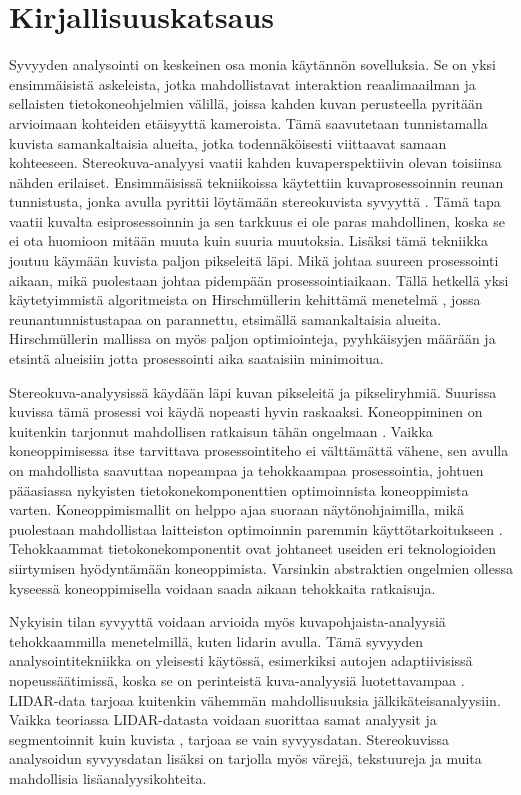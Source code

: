 \chapter{Kirjallisuuskatsaus}%
\label{ch:kirjallisuuskatsaus}

Syvyyden analysointi on keskeinen osa monia käytännön sovelluksia.
Se on yksi ensimmäisistä askeleista, jotka mahdollistavat interaktion reaalimaailman ja sellaisten tietokoneohjelmien välillä,
joissa kahden kuvan perusteella pyritään arvioimaan kohteiden etäisyyttä kameroista. 
Tämä saavutetaan tunnistamalla kuvista samankaltaisia alueita, jotka todennäköisesti viittaavat samaan kohteeseen.
Stereokuva-analyysi vaatii kahden kuvaperspektiivin olevan toisiinsa nähden erilaiset.
Ensimmäisissä tekniikoissa käytettiin kuvaprosessoinnin reunan tunnistusta, jonka avulla pyrittii löytämään stereokuvista syvyyttä \cite{BakerHenryHarlyn1982DfEa}.
Tämä tapa vaatii kuvalta esiprosessoinnin ja sen tarkkuus ei ole paras mahdollinen, koska se ei ota huomioon mitään muuta kuin suuria muutoksia.
Lisäksi tämä tekniikka joutuu käymään kuvista paljon pikseleitä läpi. 
Mikä johtaa suureen prosessointi aikaan, mikä puolestaan johtaa pidempään prosessointiaikaan.
Tällä hetkellä yksi käytetyimmistä algoritmeista on Hirschmüllerin kehittämä menetelmä \cite{hirschmuller2005babel},
jossa reunantunnistustapaa on parannettu, etsimällä samankaltaisia alueita. 
Hirschmüllerin mallissa on myös paljon optimiointeja, pyyhkäisyjen määrään ja etsintä alueisiin jotta prosessointi aika saataisiin minimoitua.

Stereokuva-analyysissä käydään läpi kuvan pikseleitä ja pikseliryhmiä.
Suurissa kuvissa tämä prosessi voi käydä nopeasti hyvin raskaaksi.
Koneoppiminen on kuitenkin tarjonnut mahdollisen ratkaisun tähän ongelmaan \cite{LagaHamid2022ASoD}.
Vaikka koneoppimisessa itse tarvittava prosessointiteho ei välttämättä vähene, 
sen avulla on mahdollista saavuttaa nopeampaa ja tehokkaampaa prosessointia,
johtuen pääasiassa nykyisten tietokonekomponenttien optimoinnista koneoppimista varten.
Koneoppimismallit on helppo ajaa suoraan näytönohjaimilla, mikä puolestaan mahdollistaa laitteiston optimoinnin paremmin käyttötarkoitukseen \cite{LeeVictorW2010Dt1G}.
Tehokkaammat tietokonekomponentit ovat johtaneet useiden eri teknologioiden siirtymisen hyödyntämään koneoppimista.
Varsinkin abstraktien ongelmien ollessa kyseessä koneoppimisella voidaan saada aikaan tehokkaita ratkaisuja.


Nykyisin tilan syvyyttä voidaan arvioida myös kuvapohjaista-analyysiä tehokkaammilla menetelmillä, kuten lidarin avulla.
Tämä syvyyden analysointitekniikka on yleisesti käytössä, esimerkiksi autojen adaptiivisissä nopeussäätimissä, koska se on perinteistä kuva-analyysiä luotettavampaa \cite{RorizRicardo2022ALTA}.
LIDAR-data tarjoaa kuitenkin vähemmän mahdollisuuksia jälkikäteisanalyysiin.
Vaikka teoriassa LIDAR-datasta voidaan suorittaa samat analyysit ja segmentoinnit kuin kuvista \cite{SunJiaming2020DRS3}, tarjoaa se vain syvyysdatan.
Stereokuvissa analysoidun syvyysdatan lisäksi on tarjolla myös värejä, tekstuureja ja muita mahdollisia lisäanalyysikohteita.

